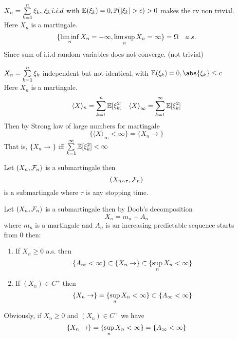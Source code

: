 \begin{example}
$X_n = \sum\limits_{k=1}^n \xi_k,\,\xi_k \, i.i.d$ with $\mathbb{E}(\xi_k) = 0, \mathbb{P}(|\xi_k| > c) >0$ makes the rv non trivial. Here $X_n$ is a martingale.
\begin{equation*}
    \{\liminf\limits_{n} X_n = -\infty, \limsup\limits_{n} X_n = \infty\} = \Omega \quad a.s.
\end{equation*}Since sum of i.i.d random variables does not converge. (not trivial)
\end{example}
\begin{example}
$X_n = \sum\limits_{k=1}^n \xi_k$ independent but not identical, with $\E(\xi_k) = 0, \abs{\xi_k} \leq c$ \\
Here $X_n$ is a martingale. 
\begin{align*}
    \langle{X} \rangle_n = \sum\limits_{k=1}^n \mathbb{E}[\xi_k^2] \quad {\langle{X} \rangle}_\infty = \sum\limits_{k=1}^\infty \mathbb{E}[\xi_k^2]
\end{align*}
Then by Strong law of large numbers for martingale
\begin{equation*}
    \{{\langle{X} \rangle}_\infty <\infty\} = \{X_n \rightarrow\}
\end{equation*} That is, $\{X_n \rightarrow\}$ iff $\sum\limits_{k=1}^\infty \mathbb{E}[\xi_k^2] <\infty$
\end{example}

\begin{lem}
Let $(X_n, \mathcal{F}_n)$ is a submartingale then
\begin{equation*}
    (X_{n\wedge\tau}, \mathcal{F}_n)
\end{equation*} is a submartingale where $\tau$ is any stopping time.
\end{lem}

\newpage 
\begin{thm}
Let $(X_n, \mathcal{F}_n)$ is a submartingale then by Doob's decomposition
\begin{equation*}
    X_n = m_n + A_n
\end{equation*}where $m_n$ is a martingale and $A_n$ is an increasing predictable sequence starts from 0 then:
\begin{enumerate}
    \item If $X_n \geq 0$ a.s. then \begin{equation*}
        \{A_\infty < \infty\} \subset \{X_n \rightarrow\} \subset \{\sup\limits_{n} X_n < \infty\}
    \end{equation*}
    \item If $(X_n)\in C^+$ then \begin{equation*}
         \{X_n \rightarrow\} = \{\sup\limits_{n} X_n < \infty\}\subset \{A_\infty < \infty\} 
    \end{equation*}
\end{enumerate}
\end{thm}
\begin{cor}
    Obviously, if $X_n \geq 0$ and $(X_n)\in C^+$ we have \begin{equation*}
         \{X_n \rightarrow\} = \{\sup\limits_{n} X_n < \infty\} = \{A_\infty < \infty\} 
    \end{equation*}
\end{cor}

